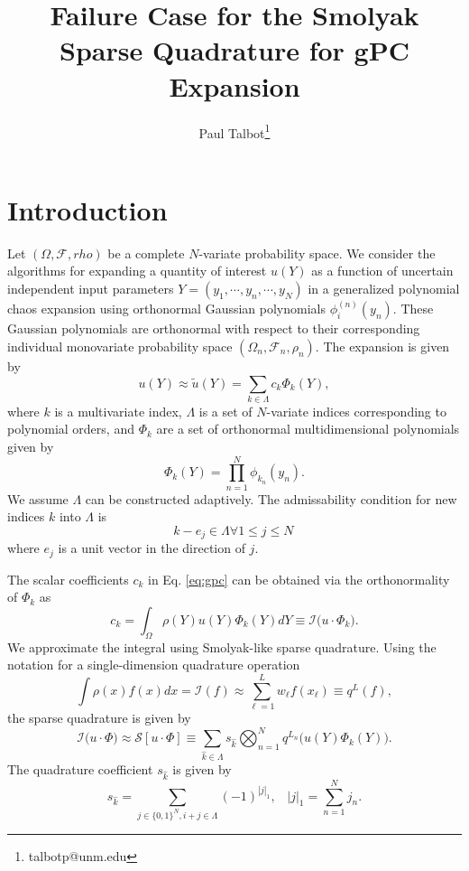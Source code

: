 \documentclass[11pt]{article}
\begin{document}
\title{Failure Case for the Smolyak Sparse Quadrature for gPC Expansion}

\author[]{Paul Talbot\thanks{talbotp@unm.edu}}
\date{}
\renewcommand\Authands{ and }
\maketitle
\section{Introduction}
Let $(\Omega,\mathcal{F},rho)$ be a complete $N$-variate probability space.
We consider the algorithms for expanding a quantity of interest $u(Y)$ as a function of uncertain independent
input parameters $Y = (y_1,\cdots,y_n,\cdots,y_N)$ in a generalized polynomial chaos expansion using
orthonormal Gaussian polynomials $\phi_i^{(n)}(y_n)$.  These Gaussian polynomials are orthonormal with respect
to their corresponding individual monovariate probability space $(\Omega_n,\mathcal{F}_n,\rho_n)$.  The
expansion is given by
\begin{equation}\label{eq:gpc}
  u(Y)\approx \tilde u(Y) = \sum_{k\in\Lambda} c_k \Phi_k(Y),
\end{equation}
where $k$ is a multivariate index, $\Lambda$ is a set of $N$-variate indices corresponding to polynomial
orders, and $\Phi_k$ are a set of orthonormal multidimensional polynomials given by
\begin{equation}
  \Phi_k(Y) = \prod_{n=1}^N \phi_{k_n}(y_n).
\end{equation}
We assume $\Lambda$ can be constructed adaptively.  The admissability condition for new indices $k$ into
$\Lambda$ is
\begin{equation}
  k-e_j \in \Lambda \forall 1\leq j\leq N\,
\end{equation}
where $e_j$ is a unit vector in the direction of $j$.

The scalar coefficients $c_k$ in Eq. \ref{eq:gpc} can be obtained via the orthonormality of $\Phi_k$ as
\begin{equation}\label{eq:coeffs}
  c_k = \int_\Omega \rho(Y) u(Y) \Phi_k(Y) dY \equiv \mathcal{I}\big(u\cdot\Phi_k\big).
\end{equation}
We approximate the integral using Smolyak-like sparse quadrature. Using the notation for a single-dimension
quadrature operation
\begin{equation}
  \int \rho(x)f(x)dx = \mathcal{I}(f) \approx \sum_{\ell=1}^L w_\ell f(x_\ell) \equiv q^{L}(f),
\end{equation}
the sparse quadrature is given by
\begin{equation}
  \mathcal{I}\big(u\cdot\Phi\big)\approx\mathcal{S}[u\cdot\Phi]\equiv \sum_{\hat k\in\Lambda} s_{\hat k} \bigotimes_{n=1}^N
  q^{L_n}\big(u(Y)\Phi_k(Y)\big).
\end{equation}
The quadrature coefficient $s_{\hat k}$ is given by
\begin{equation}
  s_{\hat k} = \sum_{j\in\{0,1\}^N,i+j\in\Lambda} (-1)^{|j|_1}, \hspace{10pt} |j|_1 = \sum_{n=1}^N j_n. 
\end{equation}
\end{document}
